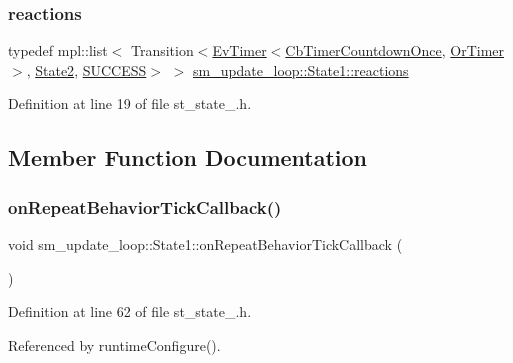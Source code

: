 \subsubsection{\texorpdfstring{reactions}{reactions}}
{\footnotesize\ttfamily typedef mpl\+::list$<$ Transition$<$\hyperlink{structcl__ros__timer_1_1EvTimer}{Ev\+Timer}$<$\hyperlink{classcl__ros__timer_1_1CbTimerCountdownOnce}{Cb\+Timer\+Countdown\+Once}, \hyperlink{classsm__update__loop_1_1OrTimer}{Or\+Timer}$>$, \hyperlink{structsm__update__loop_1_1State2}{State2}, \hyperlink{structsmacc_1_1default__transition__tags_1_1SUCCESS}{S\+U\+C\+C\+E\+SS}$>$ $>$ \hyperlink{structsm__update__loop_1_1State1_a828232579aa51d4fbfe9858c2a7016ad}{sm\+\_\+update\+\_\+loop\+::\+State1\+::reactions}}



Definition at line 19 of file st\+\_\+state\+\_.\+h.



\subsection{Member Function Documentation}
\mbox{\label{structsm__update__loop_1_1State1_aba8ce8c18482665237b1a5cb28deb657}} 
\subsubsection{\texorpdfstring{on\+Repeat\+Behavior\+Tick\+Callback()}{onRepeatBehaviorTickCallback()}}
{\footnotesize\ttfamily void sm\+\_\+update\+\_\+loop\+::\+State1\+::on\+Repeat\+Behavior\+Tick\+Callback (\begin{DoxyParamCaption}{ }\end{DoxyParamCaption})\hspace{0.3cm}{\ttfamily [inline]}}



Definition at line 62 of file st\+\_\+state\+\_.\+h.



Referenced by runtime\+Configure().


